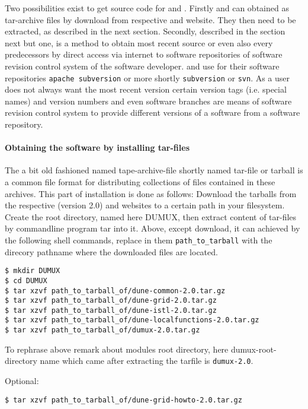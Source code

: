 Two possibilities exist to get source code for \Dune and \Dumux.
Firstly \Dune and \Dumux can obtained as tar-archive files by download from respective {\Dune} and {\Dumux} website. They then need to be extracted, as described in the next section.
Secondly, described in the section next but one, is a method to obtain most recent source or even also every predecessors by direct access via internet to software repositories of software revision control system of the software developer. \Dune and \Dumux use for their software repositories \texttt{apache subversion} or more shortly \texttt{subversion} or \texttt{svn}.
As a user does not always want the most recent version
certain version tags (i.e. special names) and version numbers and even software branches are means of software revision control system to provide different versions of a software from a software repository.

\paragraph{Obtaining the software by installing tar-files}
The a bit old fashioned named tape-archive-file shortly named tar-file or tarball is a common file format for distributing collections of files contained in these archives.
This part of installation is done as follows: 
Download the tarballs from the respective \Dune (version 2.0) and \Dumux websites to a certain path in your filesystem.
Create the {\Dune} root directory, named here DUMUX, then extract content of tar-files by commandline program tar into it.
Above, except download, it can achieved by the following shell commands, replace in them \texttt{path\_to\_tarball} with the direcory pathname where the downloaded files are located.

\begin{lstlisting}[style=Bash]
$ mkdir DUMUX
$ cd DUMUX
$ tar xzvf path_to_tarball_of/dune-common-2.0.tar.gz 
$ tar xzvf path_to_tarball_of/dune-grid-2.0.tar.gz 
$ tar xzvf path_to_tarball_of/dune-istl-2.0.tar.gz 
$ tar xzvf path_to_tarball_of/dune-localfunctions-2.0.tar.gz 
$ tar xzvf path_to_tarball_of/dumux-2.0.tar.gz
\end{lstlisting}

To rephrase above remark about modules root directory, here dumux-root-directory name which came after extracting the tarfile is \texttt{dumux-2.0}.

Optional:
\begin{lstlisting}[style=Bash]
$ tar xzvf path_to_tarball_of/dune-grid-howto-2.0.tar.gz
\end{lstlisting}


